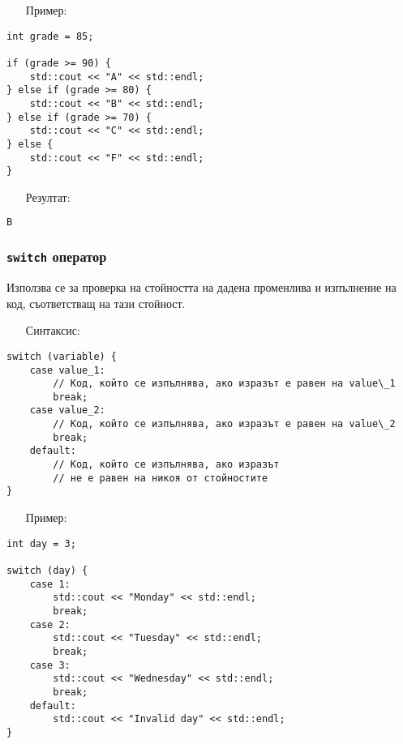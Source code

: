 \documentclass[oneside]{book}
\newcommand*{\code}[1]{\texttt{#1}}
\begin{document}
\begin{itemize}\item[Пример:]\end{itemize}\vspace{-6pt}
\begin{mdframed}\begin{lstlisting}
int grade = 85;

if (grade >= 90) {
    std::cout << "A" << std::endl;
} else if (grade >= 80) {
    std::cout << "B" << std::endl;
} else if (grade >= 70) {
    std::cout << "C" << std::endl;
} else {
    std::cout << "F" << std::endl;
}
\end{lstlisting}\end{mdframed}
\pagebreak
\begin{itemize}\item[Резултат:]\end{itemize}\vspace{-18pt}
\begin{mdframed}\begin{lstlisting}[language=bash]
B
\end{lstlisting}\end{mdframed}

\subsubsection{\code{switch} оператор}\label{sec:switch}
Използва се за проверка на стойността на дадена променлива и изпълнение на код, съответстващ на тази стойност.

\begin{itemize}\item[Синтаксис:]\end{itemize}\vspace{-12pt}
\begin{mdframed}\begin{lstlisting}
switch (variable) {
    case value_1:
        // Код, който се изпълнява, ако изразът е равен на value\_1
        break;
    case value_2:
        // Код, който се изпълнява, ако изразът е равен на value\_2
        break;
    default:
        // Код, който се изпълнява, ако изразът
        // не е равен на никоя от стойностите
}
\end{lstlisting}\end{mdframed}\vspace{-16pt}

\begin{itemize}\item[Пример:]\end{itemize}\vspace{-12pt}
\begin{mdframed}\begin{lstlisting}
int day = 3;

switch (day) {
    case 1:
        std::cout << "Monday" << std::endl;
        break;
    case 2:
        std::cout << "Tuesday" << std::endl;
        break;
    case 3:
        std::cout << "Wednesday" << std::endl;
        break;
    default:
        std::cout << "Invalid day" << std::endl;
}
\end{lstlisting}\end{mdframed}\vspace{-16pt}
\end{document}
